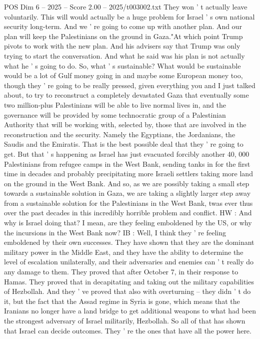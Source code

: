 \begin{textsample}{POS Dim 6 – 2025 – Score 2.00 – 2025/t003002.txt}
They won ' t actually leave voluntarily.
This will would actually be a huge problem for Israel ' s own national security long-term.
And we ' re going to come up with another plan.
And our plan will keep the Palestinians on the ground in Gaza."At which point Trump pivots to work with the new plan.
And his advisers say that Trump was only trying to start the conversation.
And what he said was his plan is not actually what he ' s going to do.
So, what ' s sustainable?
What would be sustainable would be a lot of Gulf money going in and maybe some European money too, though they ' re going to be really pressed, given everything you and I just talked about, to try to reconstruct a completely devastated Gaza that eventually some two million-plus Palestinians will be able to live normal lives in, and the governance will be provided by some technocratic group of a Palestinian Authority that will be working with, selected by, those that are involved in the reconstruction and the security.
Namely the Egyptians, the Jordanians, the Saudis and the Emiratis.
That is the best possible deal that they ' re going to get.
But that ' s happening as Israel has just evacuated forcibly another 40, 000 Palestinians from refugee camps in the West Bank, sending tanks in for the first time in decades and probably precipitating more Israeli settlers taking more land on the ground in the West Bank.
And so, as we are possibly taking a small step towards a sustainable solution in Gaza, we are taking a slightly larger step away from a sustainable solution for the Palestinians in the West Bank, twas ever thus over the past decades in this incredibly horrible problem and conflict.
HW : And why is Israel doing that?
I mean, are they feeling emboldened by the US, or why the incursions in the West Bank now?
IB : Well, I think they ' re feeling emboldened by their own successes.
They have shown that they are the dominant military power in the Middle East, and they have the ability to determine the level of escalation unilaterally, and their adversaries and enemies can ' t really do any damage to them.
They proved that after October 7, in their response to Hamas.
They proved that in decapitating and taking out the military capabilities of Hezbollah.
And they ' ve proved that also with overturning -- they didn ' t do it, but the fact that the Assad regime in Syria is gone, which means that the Iranians no longer have a land bridge to get additional weapons to what had been the strongest adversary of Israel militarily, Hezbollah.
So all of that has shown that Israel can decide outcomes.
They ' re the ones that have all the power here.

\end{textsample}
